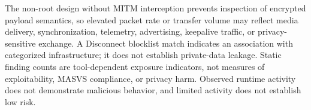 The non-root design without MITM interception prevents inspection of encrypted payload semantics, so elevated packet rate or transfer volume may reflect media delivery, synchronization, telemetry, advertising, keepalive traffic, or privacy-sensitive exchange. A Disconnect blocklist match indicates an association with categorized infrastructure; it does not establish private-data leakage. Static finding counts are tool-dependent exposure indicators, not measures of exploitability, MASVS compliance, or privacy harm. Observed runtime activity does not demonstrate malicious behavior, and limited activity does not establish low risk.
